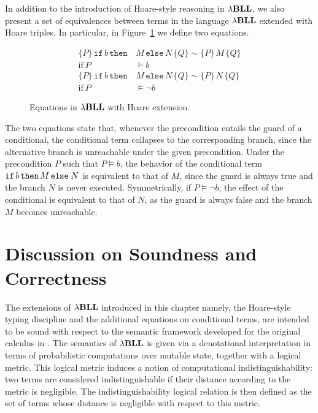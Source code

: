 In addition to the introduction of Hoare-style reasoning in ${\lambda}\mathbf{BLL}$, we also present a set of equivalences between terms in the language ${\lambda}\mathbf{BLL}$ extended with Hoare triples. In particular, in Figure~\ref{fig:hl-equations} we define two equations.
\begin{figure}[htpb]
    \centering
    \begin{align*}
    \{P\}\, \mathtt{if}\, b\, \mathtt{then}\, &M \,\mathtt{else}\, N \,\{Q\} \sim \{P\}\, M \,\{Q\} \tag{ifTrue}\label{ifTrue} \\
    \text{if} \ P &\models b
    \\[2ex]
    \{P\}\, \mathtt{if}\, b\, \mathtt{then}\, &M \,\mathtt{else}\, N \,\{Q\} \sim \{P\}\, N \,\{Q\} \tag{ifFalse}\label{ifFalse} \\
    \text{if} \ P &\models \neg b
    \end{align*}
    \caption{Equations in ${\lambda}\mathbf{BLL}$ with Hoare extension.}
    \label{fig:hl-equations}
\end{figure}

The two equations state that, whenever the precondition entails the guard of a conditional, the conditional term collapses to the corresponding branch, since the alternative branch is unreachable under the given precondition. Under the precondition $P$ such that $P \models b$, the behavior of the conditional term $\mathtt{if}\,b\,\mathtt{then}\, M\,\mathtt{else}\; N$ is equivalent to that of $M$, since the guard is always true and the branch $N$ is never executed. Symmetrically, if $P \models \neg b$, the effect of the conditional is equivalent to that of $N$, as the guard is always false and the branch $M$ becomes unreachable.

\section{Discussion on Soundness and Correctness}
The extensions of ${\lambda}\mathbf{BLL}$ introduced in this chapter namely, the Hoare-style typing discipline and the additional equations on conditional terms, are intended to be sound with respect to the semantic framework developed for the original calculus in \cite{lago2024computationalindistinguishabilitylogicalrelations}. The semantics of ${\lambda}\mathbf{BLL}$ is given via a denotational interpretation in terms of probabilistic computations over mutable state, together with a logical metric. This logical metric induces a notion of computational indistinguishability: two terms are considered indistinguishable if their distance according to the metric is negligible. The indistinguishability logical relation is then defined as the set of terms whose distance is negligible with respect to this metric.

